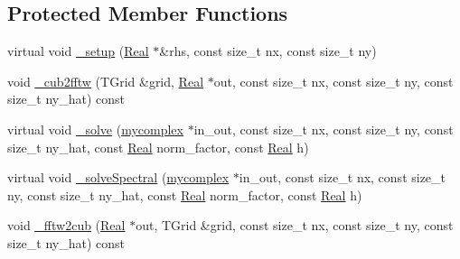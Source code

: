 \subsection*{Protected Member Functions}
\begin{DoxyCompactItemize}
\item 
virtual void \hyperlink{class_poisson_solver_scalar_f_f_t_w_a0e20043e8672d540cf4cc859d12e20ff}{\+\_\+setup} (\hyperlink{_h_d_f5_dumper_8h_a445a5f0e2a34c9d97d69a3c2d1957907}{Real} $\ast$\&rhs, const size\+\_\+t nx, const size\+\_\+t ny)
\item 
void \hyperlink{class_poisson_solver_scalar_f_f_t_w_af5a5560916d9fbc9a015709b54dbe3cd}{\+\_\+cub2fftw} (T\+Grid \&grid, \hyperlink{_h_d_f5_dumper_8h_a445a5f0e2a34c9d97d69a3c2d1957907}{Real} $\ast$out, const size\+\_\+t nx, const size\+\_\+t ny, const size\+\_\+t ny\+\_\+hat) const 
\item 
virtual void \hyperlink{class_poisson_solver_scalar_f_f_t_w_a8e651a6e6e1f0bbf6360afb933d4fac1}{\+\_\+solve} (\hyperlink{_poisson_solver_scalar_f_f_t_w_8h_a0ffff0c33f8a11fdc4272b2dad05f485}{mycomplex} $\ast$in\+\_\+out, const size\+\_\+t nx, const size\+\_\+t ny, const size\+\_\+t ny\+\_\+hat, const \hyperlink{_h_d_f5_dumper_8h_a445a5f0e2a34c9d97d69a3c2d1957907}{Real} norm\+\_\+factor, const \hyperlink{_h_d_f5_dumper_8h_a445a5f0e2a34c9d97d69a3c2d1957907}{Real} h)
\item 
virtual void \hyperlink{class_poisson_solver_scalar_f_f_t_w_ac9b65eddfae730b7b8ca9d31d96f8d5b}{\+\_\+solve\+Spectral} (\hyperlink{_poisson_solver_scalar_f_f_t_w_8h_a0ffff0c33f8a11fdc4272b2dad05f485}{mycomplex} $\ast$in\+\_\+out, const size\+\_\+t nx, const size\+\_\+t ny, const size\+\_\+t ny\+\_\+hat, const \hyperlink{_h_d_f5_dumper_8h_a445a5f0e2a34c9d97d69a3c2d1957907}{Real} norm\+\_\+factor, const \hyperlink{_h_d_f5_dumper_8h_a445a5f0e2a34c9d97d69a3c2d1957907}{Real} h)
\item 
void \hyperlink{class_poisson_solver_scalar_f_f_t_w_a07bdeb54b169896f3eb02ada52a2213c}{\+\_\+fftw2cub} (\hyperlink{_h_d_f5_dumper_8h_a445a5f0e2a34c9d97d69a3c2d1957907}{Real} $\ast$out, T\+Grid \&grid, const size\+\_\+t nx, const size\+\_\+t ny, const size\+\_\+t ny\+\_\+hat) const 
\end{DoxyCompactItemize}
